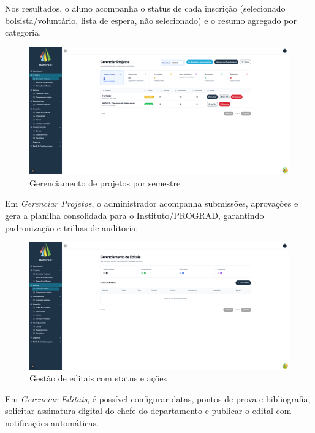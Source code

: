 \documentclass[portuguese]{sbc2025}%
\begin{document}
Nos resultados, o aluno acompanha o status de cada inscrição (selecionado bolsista/voluntário, lista de espera, não selecionado) e o resumo agregado por categoria.

\begin{figure}[h!]
  \centering
  \includegraphics[width=\linewidth]{images/monitoria/admin-manage-projects.png}
  \caption{Gerenciamento de projetos por semestre}
  \label{fig:projetos}
\end{figure}

Em \textit{Gerenciar Projetos}, o administrador acompanha submissões, aprovações e gera a planilha consolidada para o Instituto/PROGRAD, garantindo padronização e trilhas de auditoria.

\begin{figure}[h!]
  \centering
  \includegraphics[width=\linewidth]{images/monitoria/admin-edital-management.png}
  \caption{Gestão de editais com status e ações}
  \label{fig:editais}
\end{figure}

Em \textit{Gerenciar Editais}, é possível configurar datas, pontos de prova e bibliografia, solicitar assinatura digital do chefe do departamento e publicar o edital com notificações automáticas.
\end{document}
